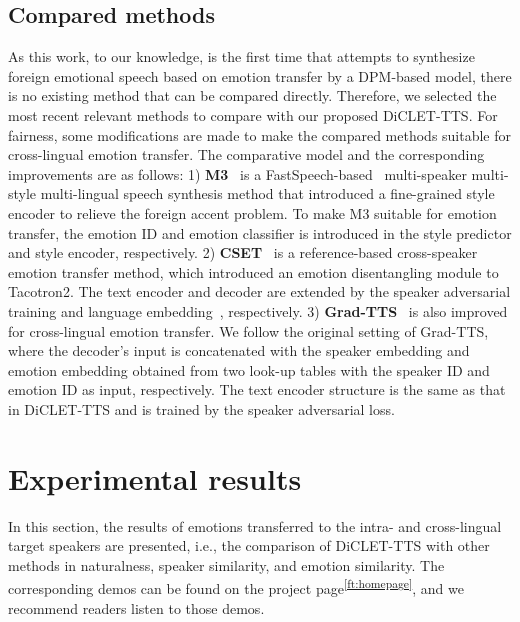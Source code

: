 \documentclass[journal,comsoc]{IEEEtran}
\begin{document}
\subsection{Compared methods}
As this work, to our knowledge, is the first time that attempts to synthesize foreign emotional speech based on emotion transfer by a DPM-based model, there is no existing method that can be compared directly. 
Therefore, we selected the most recent relevant methods to compare with our proposed DiCLET-TTS. 
For fairness, some modifications are made to make the compared methods suitable for cross-lingual emotion transfer.
The comparative model and the corresponding improvements are as follows: 
1) \textbf{M3}~\cite{shang2021incorporating} is a FastSpeech-based~\cite{Ren2019FastSpeechFR} multi-speaker multi-style multi-lingual speech synthesis method that introduced a fine-grained style encoder to relieve the foreign accent problem. 
To make M3 suitable for emotion transfer, the emotion ID and emotion classifier is introduced in the style predictor and style encoder, respectively. 
2) \textbf{CSET}~\cite{Li2021ControllableCE} is a reference-based cross-speaker emotion transfer method, which introduced an emotion disentangling module to Tacotron2. 
The text encoder and decoder are extended by the speaker adversarial training and language embedding~\cite{zhang2019learning}, respectively. 
3) \textbf{Grad-TTS}~\cite{popov2021grad} is also improved for cross-lingual emotion transfer.
We follow the original setting of Grad-TTS, where the decoder's input is concatenated with the speaker embedding and emotion embedding obtained from two look-up tables with the speaker ID and emotion ID as input, respectively.
The text encoder structure is the same as that in DiCLET-TTS and is trained by the speaker adversarial loss. 

\section{Experimental results}
\label{sc:results}

In this section, the results of emotions transferred to the intra- and cross-lingual target speakers are presented, i.e., the comparison of DiCLET-TTS with other methods in naturalness, speaker similarity, and emotion similarity.
The corresponding demos can be found on the project page\textsuperscript{\ref{ft:homepage}}, and we recommend readers listen to those demos.

\vspace{-0.2cm}
\end{document}
